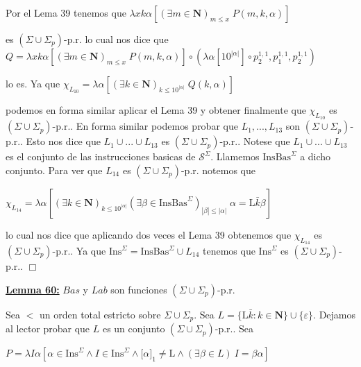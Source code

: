 Por el Lema 39 tenemos que
\(\displaystyle \lambda xk\alpha \left[ (\exists m\in \mathbf{N})_{m\leq x}\;P(m,k,\alpha ) \right] \)

es \((\Sigma \cup \Sigma _{p})\)-p.r. lo cual nos dice que
\(\displaystyle Q=\lambda xk\alpha \left[ (\exists m\in \mathbf{N})_{m\leq x}\;P(m,k,\alpha ) \right] \circ (\lambda \alpha \left[ 10^{\left\vert \alpha \right\vert } \right] \circ p_{2}^{1,1},p_{1}^{1,1},p_{2}^{1,1}) \)

lo es. Ya que
\(\displaystyle \chi _{L_{10}}=\lambda \alpha \left[ (\exists k\in \mathbf{N})_{k\leq 10^{\left\vert \alpha \right\vert }}\;Q(k,\alpha )\right] \)

podemos en forma similar aplicar el Lema 39 y obtener finalmente que \(\chi _{L_{10}}\) es \((\Sigma \cup \Sigma _{p})\)-p.r..
En forma similar podemos probar que \(L_{1},...,L_{13}\) son \((\Sigma \cup \Sigma _{p})\)-p.r.. Esto nos dice que \(L_{1}\cup ...\cup L_{13}\) es \((\Sigma \cup \Sigma _{p})\)-p.r.. Notese que \(L_{1}\cup ...\cup L_{13}\) es el conjunto de las instrucciones basicas de \(\mathcal{S}^{\Sigma }\). Llamemos \( \mathrm{InsBas}^{\Sigma }\) a dicho conjunto. Para ver que \(L_{14}\) es \( (\Sigma \cup \Sigma _{p})\)-p.r. notemos que

\(\displaystyle \chi _{L_{14}}=\lambda \alpha \left[ (\exists k\in \mathbf{N})_{k\leq 10^{\left\vert \alpha \right\vert }}(\exists \beta \in \mathrm{InsBas} ^{\Sigma })_{\left\vert \beta \right\vert \leq \left\vert \alpha \right\vert }\;\alpha =\mathrm{L}\bar{k}\beta \right] \)

lo cual nos dice que aplicando dos veces el Lema 39 obtenemos que \(\chi _{L_{14}}\) es \((\Sigma \cup \Sigma _{p})\)-p.r.. Ya que \( \mathrm{Ins}^{\Sigma }=\mathrm{InsBas}^{\Sigma }\cup L_{14}\) tenemos que \( \mathrm{Ins}^{\Sigma }\) es \((\Sigma \cup \Sigma _{p})\)-p.r.. \(\Box\)


\textbf{\underline{Lemma 60:}} \(Bas\) y \(Lab\) son funciones \((\Sigma \cup \Sigma _{p})\)-p.r.

\PROOF Sea \(< \) un orden total estricto sobre \(\Sigma \cup \Sigma _{p}\). Sea \(L=\{ \mathrm{L}\bar{k}:k\in \mathbf{N}\}\cup \{\varepsilon \}\). Dejamos al lector probar que \(L\) es un conjunto \((\Sigma \cup \Sigma _{p})\)-p.r.. Sea

\(\displaystyle P=\lambda I\alpha \left[ \alpha \in \mathrm{Ins}^{\Sigma }\wedge I\in \mathrm{Ins}^{\Sigma }\wedge \lbrack \alpha ]_{1}\neq \mathrm{L}\wedge (\exists \beta \in L)\ I=\beta \alpha \right] \)

